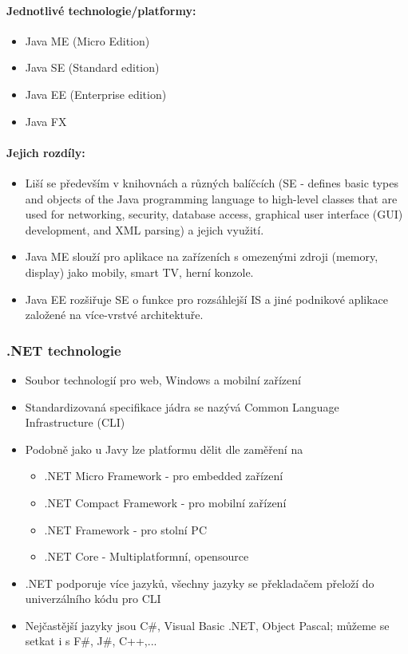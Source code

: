 \documentclass[10pt,a4paper]{article}
\begin{document}
\paragraph{Jednotlivé technologie/platformy:}
\begin{itemize}
\item Java ME (Micro Edition)
\item Java SE (Standard edition)
\item Java EE (Enterprise edition)
\item Java FX
\end{itemize}

\paragraph{Jejich rozdíly:}
\begin{itemize}
\item Liší se především v knihovnách a různých balíčcích (SE - defines basic types and objects of the Java programming language to high-level classes that are used for networking, security, database access, graphical user interface (GUI) development, and XML parsing) a jejich využití.
\item Java ME slouží pro aplikace na zařízeních s omezenými zdroji (memory, display) jako mobily, smart TV, herní konzole.
\item Java EE rozšiřuje SE o funkce pro rozsáhlejší IS a jiné podnikové aplikace založené na více-vrstvé architektuře.
\end{itemize}

\subsubsection{.NET technologie}
\begin{itemize}
\item Soubor technologií pro web, Windows a mobilní zařízení
\item Standardizovaná specifikace jádra se nazývá Common Language Infrastructure (CLI)
\item Podobně jako u Javy lze platformu dělit dle zaměření na
\begin{itemize}
\item .NET Micro Framework - pro embedded zařízení
\item .NET Compact Framework - pro mobilní zařízení
\item .NET Framework - pro stolní PC
\item .NET Core - Multiplatformní, opensource
\end{itemize}
\item .NET podporuje více jazyků, všechny jazyky se překladačem přeloží do univerzálního kódu pro CLI
\item Nejčastější jazyky jsou C\#{}, Visual Basic .NET, Object Pascal; můžeme se setkat i s F\#, J\#, C++,...
\end{itemize}
\end{document}
